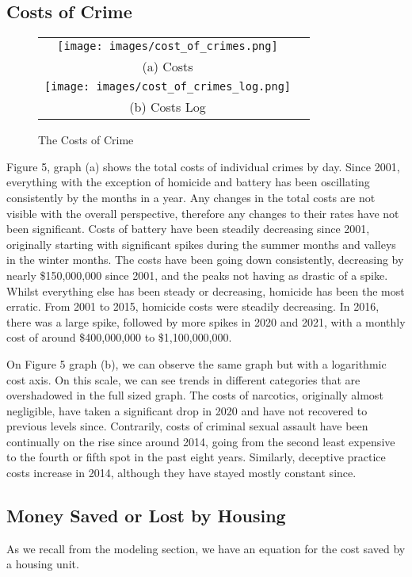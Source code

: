 \documentclass{article}
\begin{document}
\begin{onehalfspacing}
\subsection{Costs of Crime}
\begin{figure}[H]
\centering
\begin{tabular}{cc}
  \centerline{\texttt{[image: images/cost\_of\_crimes.png]}} \\ 
  (a) Costs \\[6pt]
  \centerline{\texttt{[image: images/cost\_of\_crimes\_log.png]}} \\
  (b) Costs Log \\[6pt]
\end{tabular}
\caption{The Costs of Crime}
\end{figure}

Figure 5, graph (a) shows the total costs of individual crimes by day. Since 2001, everything with the exception of homicide and battery has been oscillating consistently by the months in a year. Any changes in the total costs are not visible with the overall perspective, therefore any changes to their rates have not been significant. Costs of battery have been steadily decreasing since 2001, originally starting with significant spikes during the summer months and valleys in the winter months. The costs have been going down consistently, decreasing by nearly \$150,000,000 since 2001, and the peaks not having as drastic of a spike. Whilst everything else has been steady or decreasing, homicide has been the most erratic. From 2001 to 2015, homicide costs were steadily decreasing. In 2016, there was a large spike, followed by more spikes in 2020 and 2021, with a monthly cost of around \$400,000,000 to \$1,100,000,000.

On Figure 5 graph (b), we can observe the same graph but with a logarithmic cost axis. On this scale, we can see trends in different categories that are overshadowed in the full sized graph. The costs of narcotics, originally almost negligible, have taken a significant drop in 2020 and have not recovered to previous levels since. Contrarily, costs of criminal sexual assault have been continually on the rise since around 2014, going from the second least expensive to the fourth or fifth spot in the past eight years. Similarly, deceptive practice costs increase in 2014, although they have stayed mostly constant since.

\subsection{Money Saved or Lost by Housing}
As we recall from the modeling section, we have an equation for the cost saved by a housing unit.


\end{onehalfspacing}
\end{document}
